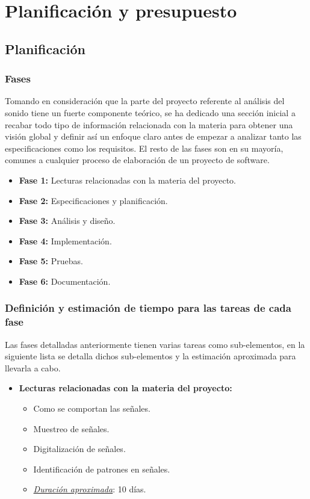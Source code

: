 \chapter{Planificación y presupuesto}

\section{Planificación}

\subsection{Fases}
Tomando en consideración que la parte del proyecto referente al análisis del sonido tiene un fuerte componente teórico, se ha dedicado una sección inicial a recabar todo tipo de información relacionada con la materia para obtener una visión global y definir así un enfoque claro antes de empezar a analizar tanto las especificaciones como los requisitos. El resto de las fases son en su mayoría, comunes a cualquier proceso de elaboración de un proyecto de software.

\begin{itemize}
  \item \textbf{Fase 1:} Lecturas relacionadas con la materia del proyecto.
  \item \textbf{Fase 2:} Especificaciones y planificación.
  \item \textbf{Fase 3:} Análisis y diseño.
  \item \textbf{Fase 4:} Implementación.
  \item \textbf{Fase 5:} Pruebas.
  \item \textbf{Fase 6:} Documentación.
\end{itemize}

\newpage
\subsection{Definición y estimación de tiempo para las tareas de cada fase}

Las fases detalladas anteriormente tienen varias tareas como sub-elementos, en la siguiente lista se detalla dichos sub-elementos y la estimación aproximada para llevarla a cabo.

\begin{itemize}
   \item \textbf{Lecturas relacionadas con la materia del proyecto:}
   \begin{itemize}
    \item Como se comportan las señales.
    \item Muestreo de señales.
    \item Digitalización de señales.
    \item Identificación de patrones en señales.
    \item \underline{\textit{Duración aproximada}}: 10 días.
    \end{itemize}
\end{itemize}

